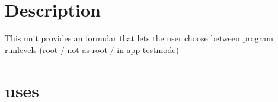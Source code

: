 \documentclass{report}
\begin{document}
\section{Description}
This unit provides an formular that lets the user choose between program runlevels (root / not as root / in app{-}testmode)
\section{uses}
\end{document}
